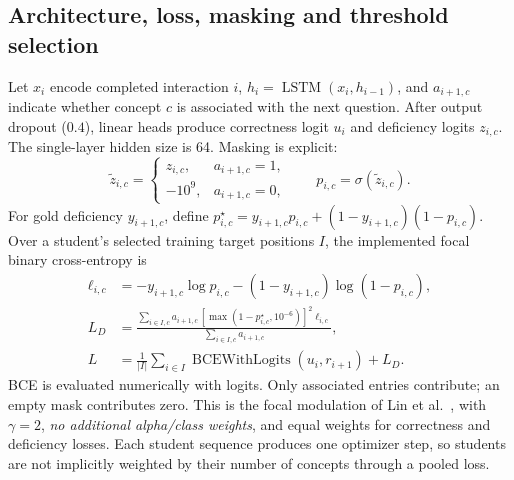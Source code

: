 \documentclass[11pt]{article}
\begin{document}
\subsection{Architecture, loss, masking and threshold selection}
Let $x_i$ encode completed interaction $i$, $h_i=\operatorname{LSTM}(x_i,h_{i-1})$, and $a_{i+1,c}$ indicate whether concept $c$ is associated with the next question. After output dropout ($0.4$), linear heads produce correctness logit $u_i$ and deficiency logits $z_{i,c}$. The single-layer hidden size is 64. Masking is explicit:
\begin{equation}
\tilde z_{i,c}=\begin{cases}z_{i,c},&a_{i+1,c}=1,\\-10^9,&a_{i+1,c}=0,\end{cases}
\qquad p_{i,c}=\sigma(\tilde z_{i,c}).
\end{equation}
For gold deficiency $y_{i+1,c}$, define $p^{\star}_{i,c}=y_{i+1,c}p_{i,c}+(1-y_{i+1,c})(1-p_{i,c})$. Over a student's selected training target positions $I$, the implemented focal binary cross-entropy is
\begin{align}
\ell_{i,c}&=-y_{i+1,c}\log p_{i,c}-(1-y_{i+1,c})\log(1-p_{i,c}),\\
L_D&=\frac{\sum_{i\in I,c}a_{i+1,c}\,[\max(1-p^{\star}_{i,c},10^{-6})]^2\ell_{i,c}}
{\sum_{i\in I,c}a_{i+1,c}},\\
L&=\frac{1}{|I|}\sum_{i\in I}\operatorname{BCEWithLogits}(u_i,r_{i+1})+L_D.
\end{align}
BCE is evaluated numerically with logits. Only associated entries contribute; an empty mask contributes zero. This is the focal modulation of Lin et al.\ \cite{lin2017focal}, with $\gamma=2$, \emph{no additional alpha/class weights}, and equal weights for correctness and deficiency losses. Each student sequence produces one optimizer step, so students are not implicitly weighted by their number of concepts through a pooled loss.
\end{document}
